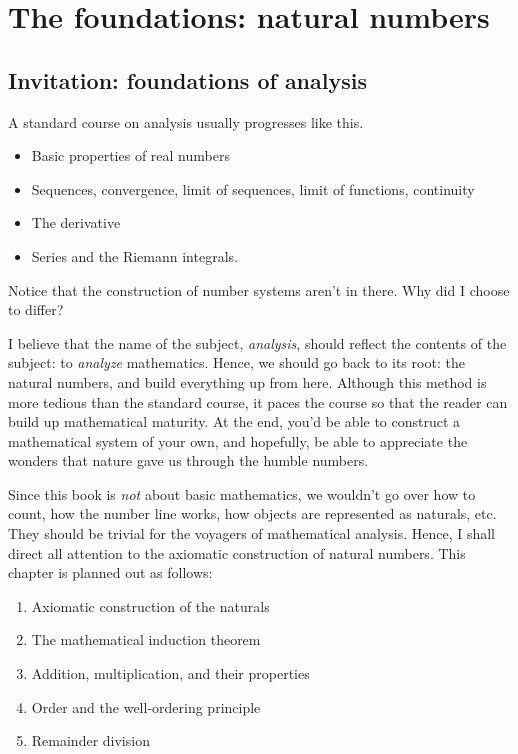 \chapter{The foundations: natural numbers}


\section{Invitation: foundations of analysis}

A standard course on analysis usually progresses like this.
\begin{itemize}[noitemsep]
  \item Basic properties of real numbers
  \item Sequences, convergence, limit of sequences, limit of functions, continuity
  \item The derivative
  \item Series and the Riemann integrals.
\end{itemize}
Notice that the construction of number systems aren't in there. Why did I choose to differ?

I believe that the name of the subject, \emph{analysis}, should reflect the contents of the subject:
to \emph{analyze} mathematics. Hence, we should go back to its root: the natural numbers, and build
everything up from here. Although this method is more tedious than the standard course, it paces the
course so that the reader can build up mathematical maturity. At the end, you'd be able to construct
a mathematical system of your own, and hopefully, be able to appreciate the wonders that nature gave
us through the humble numbers.

Since this book is \emph{not} about basic mathematics, we wouldn't go over how to count, how the
number line works, how objects are represented as naturals, etc. They should be trivial for the
voyagers of mathematical analysis. Hence, I shall direct all attention to the axiomatic construction
of natural numbers. This chapter is planned out as follows:
\begin{enumerate}[noitemsep]
  \item Axiomatic construction of the naturals
  \item The mathematical induction theorem
  \item Addition, multiplication, and their properties
  \item Order and the well-ordering principle
  \item Remainder division
\end{enumerate}

